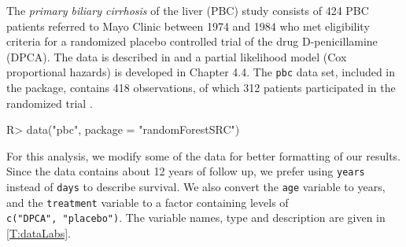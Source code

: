 \documentclass[article]{jss}
\begin{document}
The \emph{primary biliary cirrhosis} of the liver (PBC) study consists
of 424 PBC patients referred to Mayo Clinic between 1974 and 1984 who
met eligibility criteria for a randomized placebo controlled trial of
the drug D-penicillamine (DPCA). The data is described in
\cite[Chapter 0.2]{fleming:1991} and a partial likelihood model (Cox
proportional hazards) is developed in Chapter 4.4. The \texttt{pbc} data
set, included in the  package, contains 418
observations, of which 312 patients participated in the randomized trial
\cite[Appendix D]{fleming:1991}.

\begin{Schunk}
\begin{Sinput}
R> data("pbc", package = "randomForestSRC")
\end{Sinput}
\end{Schunk}

For this analysis, we modify some of the data for better formatting of
our results. Since the data contains about 12 years of follow up, we
prefer using \texttt{years} instead of \texttt{days} to describe
survival. We also convert the \texttt{age} variable to years, and the
\texttt{treatment} variable to a factor containing levels of
\texttt{c("DPCA",\ "placebo")}. The variable names, type and description
are given in \autoref{T:dataLabs}.
\end{document}
